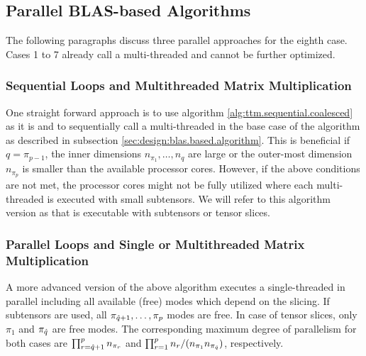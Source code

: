  
\subsection{Parallel BLAS-based Algorithms}
\label{subsec:parallel.multi-loops}
The following paragraphs discuss three parallel approaches for the eighth case.
Cases 1 to 7 already call a multi-threaded  and cannot be further optimized.
\vspace{-2em}

\subsubsection{Sequential Loops and Multithreaded Matrix Multiplication}
One straight forward approach is to use algorithm \ref{alg:ttm.sequential.coalesced} as it is and to sequentially call a multi-threaded  in the base case of the algorithm as described in subsection \ref{sec:design:blas.based.algorithm}.
This is beneficial if $q = \pi_{p-1}$, the inner dimensions $n_{\pi_1},\dots,n_{q}$ are large or the outer-most dimension $n_{\pi_{p}}$ is smaller than the available processor cores.
However, if the above conditions are not met, the processor cores might not be fully utilized where each multi-threaded  is executed with small subtensors.
We will refer to this algorithm version as  that is executable with subtensors or tensor slices.
\vspace{-1em}

\subsubsection{Parallel Loops and Single or Multithreaded Matrix Multiplication}
A more advanced version of the above algorithm executes a single-threaded  in parallel including all available (free) modes which depend on the slicing.
If subtensors are used, all $\pi_{\hat{q}+1}, \dots, \pi_{p}$ modes are free.
In case of tensor slices, only $\pi_1$ and $\pi_{\hat{q}}$ are free modes.
The corresponding maximum degree of parallelism for both cases are $\prod_{r=\hat{q}+1}^{p} n_{\pi_r}$ and $\prod_{r=1}^{p} n_{r} / (n_{\pi_1} n_{\pi_{\hat{q}}})$, respectively.



